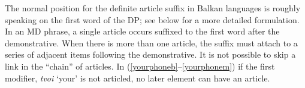 \documentclass[output=paper]{langscibook}
\begin{document}
\noindent The normal position for the definite article suffix in Balkan  languages is roughly speaking on the first word of the DP; see below for a more detailed formulation. In an MD phrase, a single article occurs suffixed to the first word after the demonstrative. When there is more than one article, the suffix must attach to a series of adjacent items following the demonstrative. It is not possible to skip a link in the ``chain'' of articles. In (\ref{yourphoneb}--\ref{yourphonem}) if the first modifier, \textit{tvoi} `your' is not articled, no later element can have an article.


\ea \label{yourphoneb}
\z


\ex \label{yourphonem}
\z\z
\end{document}
